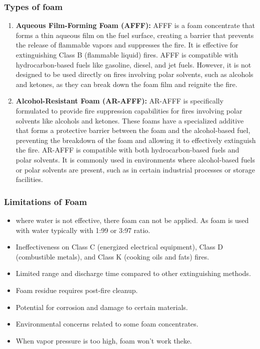 \documentclass{article}
\begin{document}
\subsubsection*{Types of foam}
\begin{enumerate}
  \item \textbf{Aqueous Film-Forming Foam (AFFF):}
  AFFF is a foam concentrate that forms a thin aqueous film on the fuel surface, creating a barrier that prevents the release of flammable vapors and suppresses the fire. It is effective for extinguishing Class B (flammable liquid) fires. AFFF is compatible with hydrocarbon-based fuels like gasoline, diesel, and jet fuels. However, it is not designed to be used directly on fires involving polar solvents, such as alcohols and ketones, as they can break down the foam film and reignite the fire.
  
  \item \textbf{Alcohol-Resistant Foam (AR-AFFF):}
  AR-AFFF is specifically formulated to provide fire suppression capabilities for fires involving polar solvents like alcohols and ketones. These foams have a specialized additive that forms a protective barrier between the foam and the alcohol-based fuel, preventing the breakdown of the foam and allowing it to effectively extinguish the fire. AR-AFFF is compatible with both hydrocarbon-based fuels and polar solvents. It is commonly used in environments where alcohol-based fuels or polar solvents are present, such as in certain industrial processes or storage facilities.
\end{enumerate}

\subsubsection*{Limitations of Foam}
\begin{itemize}
  \item where water is not effective, there foam can not be applied. As foam is used with water typically with 1:99 or 3:97 ratio. 
  \item Ineffectiveness on Class C (energized electrical equipment), Class D (combustible metals), and Class K (cooking oils and fats) fires.
  \item Limited range and discharge time compared to other extinguishing methods.
  \item Foam residue requires post-fire cleanup.
  \item Potential for corrosion and damage to certain materials.
  \item Environmental concerns related to some foam concentrates.
  \item When vapor pressure is too high, foam won't work theke. 
\end{itemize}
\pagebreak
\end{document}
